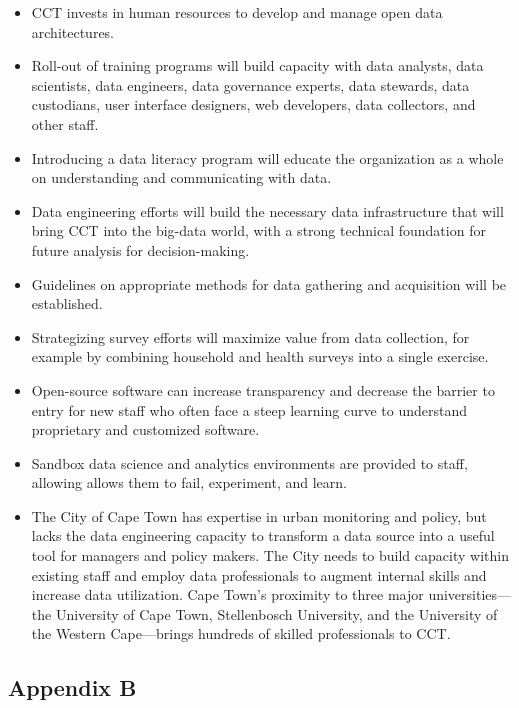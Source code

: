\documentclass[
]{book}
\providecommand{\tightlist}{%
  \setlength{\itemsep}{0pt}\setlength{\parskip}{0pt}}
\begin{document}
\begin{itemize}
\tightlist
\item
  CCT invests in human resources to develop and manage open data architectures.
\item
  Roll-out of training programs will build capacity with data analysts, data scientists, data engineers, data governance experts, data stewards, data custodians, user interface designers, web developers, data collectors, and other staff.
\item
  Introducing a data literacy program will educate the organization as a whole on understanding and communicating with data.
\item
  Data engineering efforts will build the necessary data infrastructure that will bring CCT into the big-data world, with a strong technical foundation for future analysis for decision-making.
\item
  Guidelines on appropriate methods for data gathering and acquisition will be established.
\item
  Strategizing survey efforts will maximize value from data collection, for example by combining household and health surveys into a single exercise.
\item
  Open-source software can increase transparency and decrease the barrier to entry for new staff who often face a steep learning curve to understand proprietary and customized software.
\item
  Sandbox data science and analytics environments are provided to staff, allowing allows them to fail, experiment, and learn.
\item
  The City of Cape Town has expertise in urban monitoring and policy, but lacks the data engineering capacity to transform a data source into a useful tool for managers and policy makers. The City needs to build capacity within existing staff and employ data professionals to augment internal skills and increase data utilization. Cape Town's proximity to three major universities---the University of Cape Town, Stellenbosch University, and the University of the Western Cape---brings hundreds of skilled professionals to CCT.
\end{itemize}

\hypertarget{appendix-b-3}{%
\subsection*{Appendix B}\label{appendix-b-3}}
\end{document}
